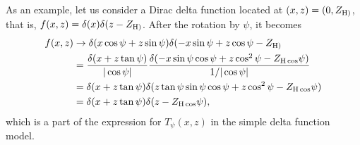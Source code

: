 As an 
example, let us consider a Dirac delta function located at $(x,z)=(0,Z_{\mathrm{H})}$,
that is, $f(x,z)=\delta(x)\delta(z-Z_{\mathrm{H})}$. After the rotation by $\psi$, it 
becomes
\begin{align*}
  f(x,z) 
  &\rightarrow 
    \delta(x\cos\psi+z\sin\psi) \delta(-x\sin\psi+z\cos\psi-Z_{\mathrm{H})} \\
  &= \frac{\delta(x+z\tan\psi)}{|\cos\psi|}
     \frac{\delta(-x\sin\psi\cos\psi+z\cos^2\psi-Z_{\mathrm{H}\cos}\psi)}{1/|\cos\psi|} \\
  &= \delta(x+z\tan\psi)\delta(z\tan\psi\sin\psi\cos\psi+z\cos^2\psi-Z_{\mathrm{H}\cos}\psi) \\
  &= \delta(x+z\tan\psi)\delta(z-Z_{\mathrm{H}\cos}\psi),
\end{align*}
which is a part of the expression for $T_\psi(x,z)$ in the simple delta 
function model.

\newpage
